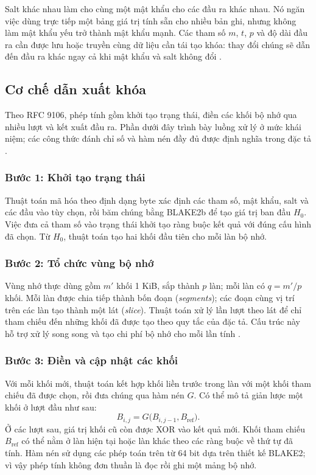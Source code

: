Salt khác nhau làm cho cùng một mật khẩu cho các đầu ra khác nhau. Nó ngăn việc dùng trực tiếp một bảng giá trị tính sẵn cho nhiều bản ghi, nhưng không làm mật khẩu yếu trở thành mật khẩu mạnh. Các tham số $m$, $t$, $p$ và độ dài đầu ra cần được lưu hoặc truyền cùng dữ liệu cần tái tạo khóa: thay đổi chúng sẽ dẫn đến đầu ra khác ngay cả khi mật khẩu và salt không đổi \cite{argon2rfc}.

\subsection{Cơ chế dẫn xuất khóa}
Theo RFC 9106, phép tính gồm khởi tạo trạng thái, điền các khối bộ nhớ qua nhiều lượt và kết xuất đầu ra. Phần dưới đây trình bày luồng xử lý ở mức khái niệm; các công thức đánh chỉ số và hàm nén đầy đủ được định nghĩa trong đặc tả \cite{argon2rfc}.

\subsubsection{Bước 1: Khởi tạo trạng thái}
Thuật toán mã hóa theo định dạng byte xác định các tham số, mật khẩu, salt và các đầu vào tùy chọn, rồi băm chúng bằng BLAKE2b để tạo giá trị ban đầu $H_0$. Việc đưa cả tham số vào trạng thái khởi tạo ràng buộc kết quả với đúng cấu hình đã chọn. Từ $H_0$, thuật toán tạo hai khối đầu tiên cho mỗi làn bộ nhớ.

\subsubsection{Bước 2: Tổ chức vùng bộ nhớ}
Vùng nhớ thực dùng gồm $m'$ khối 1 KiB, sắp thành $p$ làn; mỗi làn có $q=m'/p$ khối. Mỗi làn được chia tiếp thành bốn đoạn (\textit{segments}); các đoạn cùng vị trí trên các làn tạo thành một lát (\textit{slice}). Thuật toán xử lý lần lượt theo lát để chỉ tham chiếu đến những khối đã được tạo theo quy tắc của đặc tả. Cấu trúc này hỗ trợ xử lý song song và tạo chi phí bộ nhớ cho mỗi lần tính \cite{argon2rfc}.

\subsubsection{Bước 3: Điền và cập nhật các khối}
Với mỗi khối mới, thuật toán kết hợp khối liền trước trong làn với một khối tham chiếu đã được chọn, rồi đưa chúng qua hàm nén $G$. Có thể mô tả giản lược một khối ở lượt đầu như sau:
\begin{equation}
    B_{i,j}=G\bigl(B_{i,j-1},B_{\mathrm{ref}}\bigr).
\end{equation}
Ở các lượt sau, giá trị khối cũ còn được XOR vào kết quả mới. Khối tham chiếu $B_{\mathrm{ref}}$ có thể nằm ở làn hiện tại hoặc làn khác theo các ràng buộc về thứ tự đã tính. Hàm nén sử dụng các phép toán trên từ 64 bit dựa trên thiết kế BLAKE2; vì vậy phép tính không đơn thuần là đọc rồi ghi một mảng bộ nhớ.

